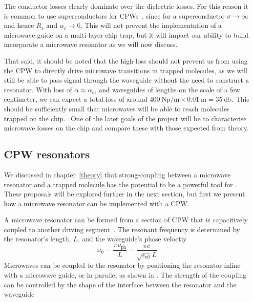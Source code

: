 The conductor losses clearly dominate over the dielectric losses. For this
reason it is common to use superconductors for CPWs~\cite{}, since for a
superconductor $\sigma \to \infty$ and hence $R_s$ and $\alpha_c \to 0$.
This will not prevent the implementation of a microwave guide on a multi-layer
chip trap, but it will impact our ability to build incorporate a microwave
resonator as we will now discuss.

That said, it should be noted that the high loss should not prevent us from
using the CPW to directly drive microwave transitions in trapped molecules, as
we will still be able to pass signal through the waveguide without the need to
construct a resonator. With loss of $\alpha \approx \alpha_c$, and waveguides of
lengths on the scale of a few centimeter, we can expect a total loss of around
$\SI{400}{\neper\per\metre} \times \SI{0.01}{\metre} = \SI{35}{\decibel}$. This
should be sufficiently small that microwaves will be able to reach molecules
trapped on the chip.~\cite{Treutlein2008}
One of the later goals of the project will be to characterise microwave losses
on the chip and compare these with those expected from theory.

\subsection{CPW resonators}
\label{mws:resonators}

We discussed in chapter~\ref{theory} that strong-coupling between a microwave
resonator and a trapped molecule has the potential to be a powerful tool for
. These proposals will be explored further in the next section, but
first we present how a microwave resonator can be implemented with a CPW.

A microwave resonator can be formed from a section of CPW that is capacitively
coupled to another driving segment~\cite{Day2003}. The resonant frequency is
determined by the resonator's length, $L$, and the waveguide's phase
veloctiy~\cite{Simons2004}
%
\begin{equation}
  \omega_0 = \frac{\pi v_\text{ph}}{L} = \frac{\pi
  c}{\sqrt{\epsilon_\text{eff}} L}
\end{equation}
%
Microwaves can be coupled to the resonator by positioning the resonator inline
with a microwave guide, or in parallel as shown in . The strength of the coupling can be controlled by the shape of the
interface between the resonator and the waveguide~\cite{doi:10.1063/1.3010859}

